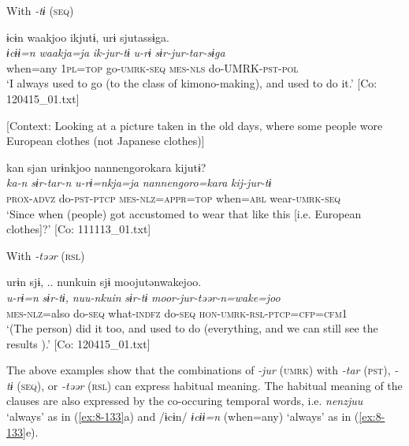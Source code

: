   With \textit{-tɨ} (\textsc{seq})

\ex
{\TM}
\glll  ɨcɨn  waakjoo  ikjutɨ,  urɨ  sjutassɨga.\\
\textit{ɨcɨɨ=n}  \textit{waakja=ja}  \textit{ik-jur-tɨ}  \textit{u-rɨ}  \textit{sɨr-jur-tar-sɨga}\\
when=any  1\textsc{pl}=\textsc{top}  go-\textsc{umrk}-\textsc{seq}  \textsc{mes}-\textsc{nls}  do-UMRK-\textsc{pst}-\textsc{pol}\\
\glt ‘I always used to go (to the class of kimono-making), and used to do it.’ [Co: 120415\_01.txt]

\ex {}[Context: Looking at a picture taken in the old days, where some people wore European clothes (not Japanese clothes)]

{\TM}
\glll  kan  sjan  urɨnkjoo  {\textbar}nannengoro{\textbar}kara      kijutɨ?\\
\textit{ka-n}  \textit{sɨr-tar-n}  \textit{u-rɨ=nkja=ja}  \textit{nannengoro=kara}     \textit{kij-jur-tɨ}\\
\textsc{prox}-\textsc{advz}  do-\textsc{pst}-\textsc{ptcp}  \textsc{mes}-\textsc{nlz}=\textsc{appr}=\textsc{top}  when=\textsc{abl}   wear-\textsc{umrk}-\textsc{seq}\\
\glt ‘Since when (people) got accustomed to wear that like this [i.e. European clothes]?’ [Co: 111113\_01.txt]

  With \textit{-təər} (\textsc{rsl})

\ex
{\TM}
\glll  urɨn  sjɨ, ..  nunkuin  sjɨ      moojutənwakejoo.\\
\textit{u-rɨ=n}  \textit{sɨr-tɨ,}  \textit{nuu-nkuin}  \textit{sɨr-tɨ}    \textit{moor-jur-təər-n=wake=joo}\\
\textsc{mes}-\textsc{nlz}=also  do-\textsc{seq}  what-\textsc{indfz}  do-\textsc{seq}  \textsc{hon}-\textsc{umrk}-\textsc{rsl}-\textsc{ptcp}=\textsc{cfp}=\textsc{cfm1}\\
\glt ‘(The person) did it too, and used to do (everything, and we can still see the results ).’ [Co: 120415\_01.txt]
\z
\z

The above examples show that the combinations of \textit{-jur} (\textsc{umrk}) with \textit{-tar} (\textsc{pst}), \textit{-tɨ} (\textsc{seq}), or \textit{-təər} (\textsc{rsl}) can express habitual meaning. The habitual meaning of the clauses are also expressed by the co-occuring temporal words, i.e. \textit{nenzjuu} ‘always’ as in (\ref{ex:8-133}a) and /ɨcɨn/ \textit{ɨcɨɨ=n} (when=any) ‘always’ as in (\ref{ex:8-133}e).

